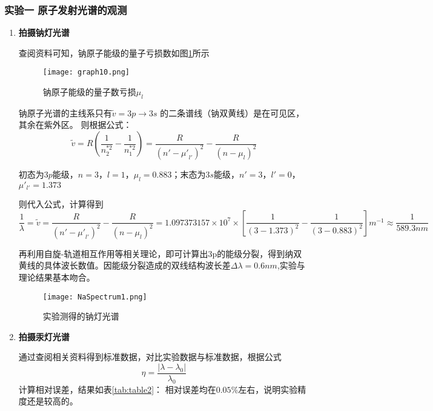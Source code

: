 \documentclass[dvipsnames, svgnames,a4paper,11pt]{article}
\begin{document}
	\subsubsection{实验一 \quad 原子发射光谱的观测}
		
		\begin{enumerate}
			\item \textbf{拍摄钠灯光谱}
			
				查阅资料可知，钠原子能级的量子亏损数如图\ref{fig:graph10}所示
				
				\begin{figure}[htbp]
					\centering
					\texttt{[image: graph10.png]}
					\caption{钠原子能级的量子数亏损$\mu_l$}
					\label{fig:graph10}
				\end{figure}
				
				钠原子光谱的主线系只有$\widetilde{v}=3p \rightarrow 3s$ 的二条谱线（钠双黄线）是在可见区，其余在紫外区。
				则根据公式：
				\[
				\widetilde{v}=R(\frac{1}{n_2^{*2}}-\frac{1}{n_1^{*2}})=\frac{R}{{(n'-{\mu'}_{l'})}^2}-\frac{R}{{(n-\mu_l)}^2}
				\]
				
				初态为$3p$能级，$n=3$，$l=1$，$\mu_l=0.883$；末态为$3s$能级，$n'=3$，$l'=0$，$\mu'_{l'}=1.373$
				
				则代入公式，计算得到
				\[ \frac{1}{\lambda}=\widetilde{v}=\frac{R}{{(n'-{\mu'}_{l'})}^2}-\frac{R}{{(n-\mu_l)}^2}=1.097373157\times10^{7}\times[\frac{1}{(3-1.373)^2}-\frac{1}{(3-0.883)^2}]m^{-1}\approx\frac{1}{589.3nm}
				\]
				
				再利用自旋-轨道相互作用等相关理论，即可计算出3p的能级分裂，得到纳双黄线的具体波长数值。因能级分裂造成的双线结构波长差$\Delta\lambda=0.6nm$,实验与理论结果基本吻合。
				
				\begin{figure}[htbp]
					\centering
					\texttt{[image: NaSpectrum1.png]}
					\caption{实验测得的钠灯光谱}
					\label{fig:NaSpectrum}
				\end{figure}
				

			
				
			
			\item \textbf{拍摄汞灯光谱}
				
				通过查阅相关资料得到标准数据，对比实验数据与标准数据，根据公式
				\[ \eta=\frac{\left|\lambda-\lambda_0\right|}{\lambda_0} \]
				计算相对误差，结果如表\ref{tab:table2}：
				相对误差均在$0.05\%$左右，说明实验精度还是较高的。
				


\end{enumerate}
\end{document}
